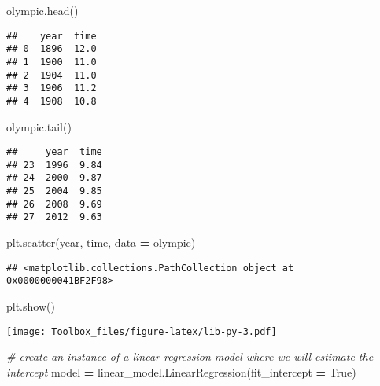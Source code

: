 \documentclass[
]{book}
\newenvironment{Shaded}{\begin{snugshade}}{\end{snugshade}}
\newcommand{\CommentTok}[1]{\textcolor[rgb]{0.56,0.35,0.01}{\textit{#1}}}
\newcommand{\NormalTok}[1]{#1}
\newcommand{\OperatorTok}[1]{\textcolor[rgb]{0.81,0.36,0.00}{\textbf{#1}}}
\newcommand{\StringTok}[1]{\textcolor[rgb]{0.31,0.60,0.02}{#1}}
\newcommand{\VariableTok}[1]{\textcolor[rgb]{0.00,0.00,0.00}{#1}}
\begin{document}
\begin{Shaded}
\begin{Highlighting}[]
\NormalTok{olympic.head()}
\end{Highlighting}
\end{Shaded}

\begin{verbatim}
##    year  time
## 0  1896  12.0
## 1  1900  11.0
## 2  1904  11.0
## 3  1906  11.2
## 4  1908  10.8
\end{verbatim}

\begin{Shaded}
\begin{Highlighting}[]
\NormalTok{olympic.tail()}
\end{Highlighting}
\end{Shaded}

\begin{verbatim}
##     year  time
## 23  1996  9.84
## 24  2000  9.87
## 25  2004  9.85
## 26  2008  9.69
## 27  2012  9.63
\end{verbatim}

\begin{Shaded}
\begin{Highlighting}[]
\NormalTok{plt.scatter(}\StringTok{\textquotesingle{}year\textquotesingle{}}\NormalTok{, }\StringTok{\textquotesingle{}time\textquotesingle{}}\NormalTok{, data }\OperatorTok{=}\NormalTok{ olympic)}
\end{Highlighting}
\end{Shaded}

\begin{verbatim}
## <matplotlib.collections.PathCollection object at 0x0000000041BF2F98>
\end{verbatim}

\begin{Shaded}
\begin{Highlighting}[]
\NormalTok{plt.show()}
\end{Highlighting}
\end{Shaded}

\texttt{[image: Toolbox\_files/figure-latex/lib-py-3.pdf]}

\begin{Shaded}
\begin{Highlighting}[]
\CommentTok{\# create an instance of a linear regression model where we will estimate the intercept}
\NormalTok{model }\OperatorTok{=}\NormalTok{ linear\_model.LinearRegression(fit\_intercept }\OperatorTok{=} \VariableTok{True}\NormalTok{)}
\end{Highlighting}
\end{Shaded}
\end{document}
